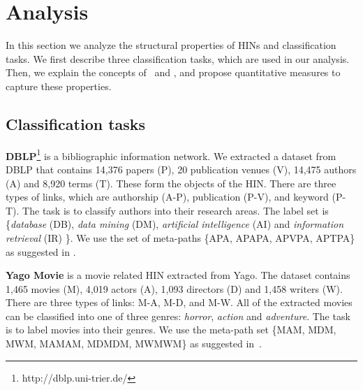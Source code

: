 \section{Analysis}
\label{sec:analysis}
In this section we analyze the structural properties of HINs and classification tasks. We first describe three classification tasks,
which are used in our analysis. Then, we explain the concepts of \chn\ and \cnn, and propose quantitative measures to 
capture these properties.


\subsection{Classification tasks}

\textbf{DBLP}\footnote{http://dblp.uni-trier.de/} is a bibliographic information network. 
We extracted a dataset from DBLP that contains 14,376 papers (P), 20 publication venues (V), 14,475 authors (A) and 
8,920 terms (T). 
These form the objects of the HIN. 
There are three types of links, which are authorship (A-P), publication (P-V), and keyword (P-T).
The task is to classify authors into their research areas. 
The label set is \{\emph{database} (DB), \emph{data mining} (DM), \emph{artificial intelligence} (AI) and
\emph{information retrieval} (IR) \}.
We use the set of meta-paths \{APA, APAPA, APVPA, APTPA\} 
as suggested in \cite{DBLP:dblp_conf/kdd/SunNHYYY12}.

\textbf{Yago Movie} is a movie related HIN extracted from Yago. The dataset contains 1,465 movies (M), 4,019 actors (A), 1,093 directors (D) and 1,458 writers (W). There are three types of links: M-A, M-D, and M-W. 
All of the extracted movies can be classified into one of three genres: \emph{horror}, \emph{action} and \emph{adventure}.
The task is to label movies into their genres.
We use the meta-path set \{MAM, MDM, MWM, MAMAM, MDMDM, MWMWM\} as suggested
in~\cite{DBLP:dblp_conf/cikm/WanLKYGCH15}.

